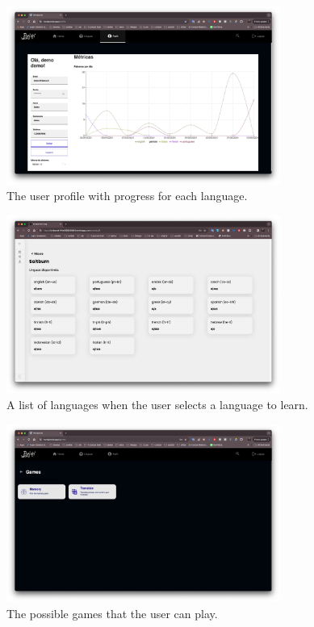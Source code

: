 \documentclass[12pt]{article}
\begin{document}
    \begin{figure}
      \centering
      \caption{
      The user profile with progress for each language.
      }
      \label{fig:site3}
      \includegraphics[width=0.8\textwidth]{assets/22.png}
    \end{figure}

    \begin{figure}
      \centering
      \caption{
      A list of languages when the user selects a language to learn.
      }
      \label{fig:site4}
      \includegraphics[width=0.8\textwidth]{assets/25.png}
    \end{figure}

    \begin{figure}
      \centering
      \caption{
      The possible games that the user can play.
      }
      \label{fig:site5}
      \includegraphics[width=0.8\textwidth]{assets/5.png}
    \end{figure}
\end{document}

